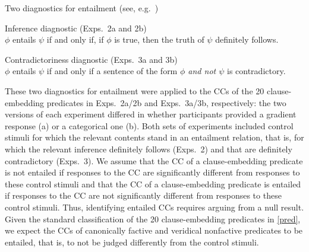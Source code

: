\documentclass{language}
\newcommand{\6}{\mbox{$[\hspace*{-.6mm}[$}}
\newcommand{\9}{\mbox{$]\hspace*{-.6mm}]$}}
\begin{document}
\begin{exe}
\ex\label{diag} Two diagnostics for entailment \hfill (see, e.g.\ \citealt[\S3.1]{ccmg90})
\begin{xlist}
\ex  Inference diagnostic (Exps.~2a and 2b)\\ $\phi$ entails $\psi$ if and only if, if $\phi$ is true, then the truth of $\psi$ definitely follows. 

\ex  Contradictoriness diagnostic  (Exps.~3a and 3b)\\ $\phi$ entails $\psi$ if and only if a sentence of the form {\em $\phi$ and not $\psi$} is contradictory. 

\end{xlist}
\end{exe}
These two diagnostics for entailment were applied to the CCs of the 20 clause-embedding predicates in Exps.~2a/2b and Exps.~3a/3b, respectively: the two versions of each experiment differed in whether participants provided a gradient response (a) or a categorical one (b).  Both sets of experiments included control stimuli for which the relevant contents stand in an entailment relation, that is, for which the relevant inference definitely follows (Exps.~2) and that are definitely contradictory (Exps.~3). We assume that the CC of a clause-embedding predicate is not entailed if responses to the CC are significantly different from responses to these control stimuli and that the CC of a clause-embedding predicate is entailed if responses to the CC are not significantly different from responses to these control stimuli. Thus, identifying entailed CCs  requires arguing from a null result. Given the standard classification of the 20 clause-embedding predicates in \ref{pred}, we expect the CCs of canonically factive and veridical nonfactive predicates to be entailed, that is, to not be judged   differently from the control stimuli.

\end{document}
